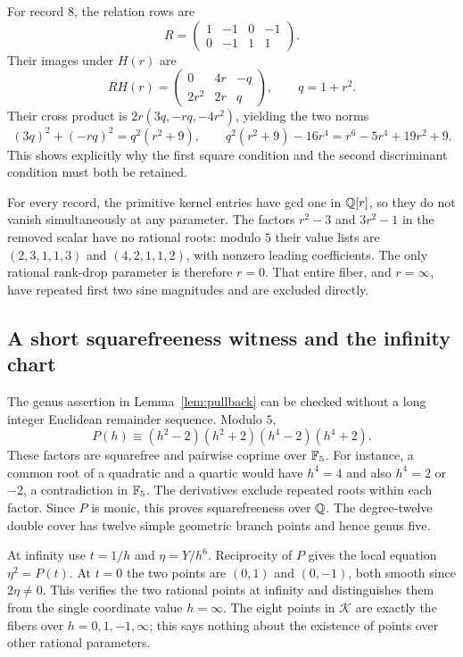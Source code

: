 For record 8, the relation rows are
\[
 R=\begin{pmatrix}1&-1&0&-1\\0&-1&1&1\end{pmatrix}.
\]
Their images under $H(r)$ are
\[
 RH(r)=\begin{pmatrix}0&4r&-q\\2r^2&2r&q\end{pmatrix},
 \qquad q=1+r^2.
\]
Their cross product is $2r(3q,-rq,-4r^2)$, yielding the two norms
\[
 (3q)^2+(-rq)^2=q^2(r^2+9),\qquad
 q^2(r^2+9)-16r^4=r^6-5r^4+19r^2+9.
\]
This shows explicitly why the first square condition and the second discriminant condition must both be retained.

For every record, the primitive kernel entries have gcd one in $\mathbb Q[r]$, so they do not vanish simultaneously at any parameter. The factors $r^2-3$ and $3r^2-1$ in the removed scalar have no rational roots: modulo $5$ their value lists are $(2,3,1,1,3)$ and $(4,2,1,1,2)$, with nonzero leading coefficients. The only rational rank-drop parameter is therefore $r=0$. That entire fiber, and $r=\infty$, have repeated first two sine magnitudes and are excluded directly.

\subsection{A short squarefreeness witness and the infinity chart}
The genus assertion in Lemma~\ref{lem:pullback} can be checked without a long integer Euclidean remainder sequence. Modulo $5$,
\begin{equation}\label{eq:Pmodfive}
 P(h)\equiv(h^2-2)(h^2+2)(h^4-2)(h^4+2).
\end{equation}
These factors are squarefree and pairwise coprime over $\mathbb F_5$. For instance, a common root of a quadratic and a quartic would have $h^4=4$ and also $h^4=2$ or $-2$, a contradiction in $\mathbb F_5$. The derivatives exclude repeated roots within each factor. Since $P$ is monic, this proves squarefreeness over $\mathbb Q$. The degree-twelve double cover has twelve simple geometric branch points and hence genus five.

At infinity use $t=1/h$ and $\eta=Y/h^6$. Reciprocity of $P$ gives the local equation $\eta^2=P(t)$. At $t=0$ the two points are $(0,1)$ and $(0,-1)$, both smooth since $2\eta\ne0$. This verifies the two rational points at infinity and distinguishes them from the single coordinate value $h=\infty$. The eight points in $\mathcal K$ are exactly the fibers over $h=0,1,-1,\infty$; this says nothing about the existence of points over other rational parameters.


